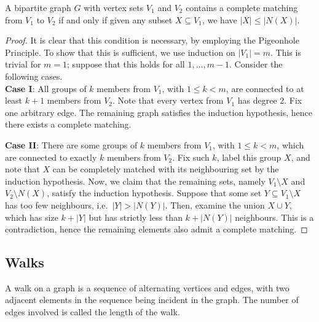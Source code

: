 \documentclass[11pt]{article}
\theoremstyle{definition}
\theoremstyle{remark}
\numberwithin{equation}{section}
\begin{document}
    \begin{theorem}
        A bipartite graph $G$ with vertex sets $V_1$ and $V_2$ contains a complete
        matching from $V_1$ to $V_2$ if and only if given any subset $X \subseteq
        V_1$, we have $|X| \leq |N(X)|$.
    \end{theorem}
    \begin{proof}
        It is clear that this condition is necessary, by employing the Pigeonhole
        Principle. To show that this is sufficient, we use induction on $|V_1| = m$.
        This is trivial for $m = 1$; suppose that this holds for all $1, \dots, m -
        1$. Consider the following cases. \\

        \textbf{Case I}: All groups of $k$ members from $V_1$, with $1 \leq k < m$,
        are connected to at least $k + 1$ members from $V_2$. Note that every vertex
        from $V_1$ has degree $2$. Fix one arbitrary edge. The remaining graph
        satisfies the induction hypothesis, hence there exists a complete matching.

        \textbf{Case II}: There are some groups of $k$ members from $V_1$, with $1
        \leq k < m$, which are connected to exactly $k$ members from $V_2$. Fix such
        $k$, label this group $X$, and note that $X$ can be completely matched with
        its neighbouring set by the induction hypothesis. Now, we claim that the
        remaining sets, namely $V_1 \setminus X$ and $V_2 \setminus N(X)$, satisfy
        the induction hypothesis. Suppose that some set $Y \subseteq V_1 \setminus X$
        has too few neighbours, i.e.\ $|Y| > |N(Y)|$. Then, examine the union $X \cup
        Y$, which has size $k + |Y|$ but has strictly less than $k + |N(Y)|$
        neighbours. This is a contradiction, hence the remaining elements also admit
        a complete matching.
    \end{proof}


    \subsection{Walks}
    \begin{definition}
        A walk on a graph is a sequence of alternating vertices and edges, with two
        adjacent elements in the sequence being incident in the graph. The number of
        edges involved is called the length of the walk.
    \end{definition}
\end{document}
